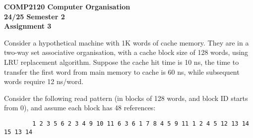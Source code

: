 \documentclass[answers]{exam}
\begin{document}
\begin{center}
    \textbf
    {\Large{COMP2120 Computer Organisation} \\
    \large{24/25 Semester 2} \\
    \large{Assignment 3}}
\end{center}

\begin{questions}

    \question Consider a hypothetical machine with 1K words of cache memory. They are in a two-way set
    associative organisation, with a cache block size of 128 words, using LRU replacement algorithm.
    Suppose the cache hit time is 10 ns, the time to transfer the first word from main memory to cache
    is 60 ns, while subsequent words require 12 ns/word.

    Consider the following read pattern (in blocks of 128 words, and block ID starts from 0),
    and assume each block has 48 references:

    \begin{verbatim}
        1 2 3 5 6 2 3 4 9 10 11 6 3 6 1 7 8 4 5 9 11 1 2 4 5 12 13 14 15 13 14
    \end{verbatim}

    
\end{questions}
\end{document}

